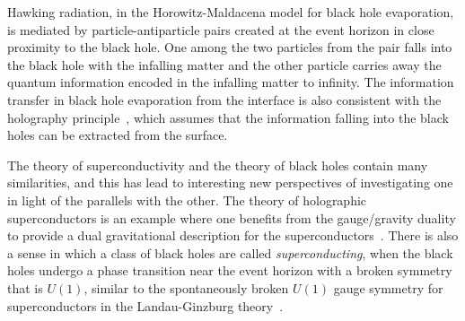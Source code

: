 \documentclass[12pt,letterpaper,aps,onecolumn,superscriptaddress,floatfix,notitlepage]{revtex4-1}
\begin{document}
	Hawking radiation, in the Horowitz-Maldacena model for black hole evaporation, is mediated by particle-antiparticle pairs created at the event horizon in close proximity to the black hole. One among the two particles from the pair falls into the black hole with the infalling matter and the other particle carries away the quantum information encoded in the infalling matter to infinity. The information transfer in black hole evaporation from the interface is also consistent with the holography principle~\cite{hologram}, which assumes that the information falling into the black holes can be extracted from the surface.  
	
	The theory of superconductivity and the theory of black holes contain many similarities, and this has lead to interesting new perspectives of investigating one in light of the parallels with the other. The theory of holographic superconductors is an example where one benefits from the gauge/gravity duality to provide a dual gravitational description for the superconductors~\cite{holo2,gaugegravity,holosc}. There is also a sense in which a class of black holes are called \textit{superconducting}, when the black holes undergo a phase transition near the event horizon with a broken symmetry that is $U(1)$, similar to the spontaneously broken $U(1)$ gauge symmetry for superconductors in the Landau-Ginzburg theory~\cite{london,scbh,scbh2}. 
	
\end{document}

